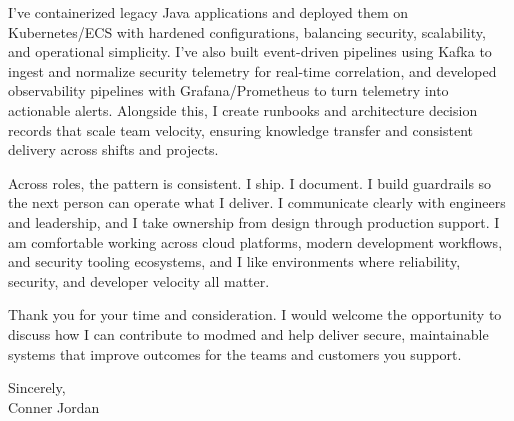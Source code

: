 \documentclass[letterpaper,11pt]{article}
\begin{document}
\vspace{16pt}

I’ve containerized legacy Java applications and deployed them on Kubernetes/ECS with hardened configurations, balancing security, scalability, and operational simplicity. I’ve also built event-driven pipelines using Kafka to ingest and normalize security telemetry for real-time correlation, and developed observability pipelines with Grafana/Prometheus to turn telemetry into actionable alerts. Alongside this, I create runbooks and architecture decision records that scale team velocity, ensuring knowledge transfer and consistent delivery across shifts and projects.

\vspace{16pt}

Across roles, the pattern is consistent. I ship. I document. I build guardrails so the next person can operate what I deliver. I communicate clearly with engineers and leadership, and I take ownership from design through production support. I am comfortable working across cloud platforms, modern development workflows, and security tooling ecosystems, and I like environments where reliability, security, and developer velocity all matter.

\vspace{16pt}

Thank you for your time and consideration. I would welcome the opportunity to discuss how I can contribute to modmed and help deliver secure, maintainable systems that improve outcomes for the teams and customers you support.

\vspace{16pt}

Sincerely,\\
Conner Jordan
\end{document}
